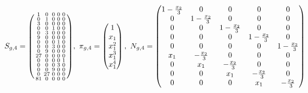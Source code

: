 \documentclass[fleqn]{article}
\begin{document}
$
S_{g,4} = \spmqty{ 1 & 0 & 0 & 0 & 0 \\ 0 & 1 & 0 & 0 & 0 \\ 3 & 0 & 0 & 0 & 0 \\ 0 & 0 & 1 & 0 & 0 \\ 0 & 3 & 0 & 0 & 0 \\ 9 & 0 & 0 & 0 & 0 \\ 0 & 0 & 0 & 1 & 0 \\ 0 & 0 & 3 & 0 & 0 \\ 0 & 9 & 0 & 0 & 0 \\ 27 & 0 & 0 & 0 & 0 \\ 0 & 0 & 0 & 0 & 1 \\ 0 & 0 & 0 & 3 & 0 \\ 0 & 0 & 9 & 0 & 0 \\ 0 & 27 & 0 & 0 & 0 \\ 81 & 0 & 0 & 0 & 0 },~
\pi_{g,4} = \pmqty{
    1       \\
    x_{1}   \\
    x_{1}^2 \\
    x_{1}^3 \\
    x_{1}^4 \\
},~
N_{g,4} = \pmqty{
    1-\frac{x_{2}}{3} & 0                 & 0                 & 0                 & 0                 \\
    0                 & 1-\frac{x_{2}}{3} & 0                 & 0                 & 0                 \\
    0                 & 0                 & 1-\frac{x_{2}}{3} & 0                 & 0                 \\
    0                 & 0                 & 0                 & 1-\frac{x_{2}}{3} & 0                 \\
    0                 & 0                 & 0                 & 0                 & 1-\frac{x_{2}}{3} \\
    x_{1}             & -\frac{x_{2}}{3}  & 0                 & 0                 & 0                 \\
    0                 & x_{1}             & -\frac{x_{2}}{3}  & 0                 & 0                 \\
    0                 & 0                 & x_{1}             & -\frac{x_{2}}{3}  & 0                 \\
    0                 & 0                 & 0                 & x_{1}             & -\frac{x_{2}}{3}  \\
}
$

\bigskip
\end{document}
